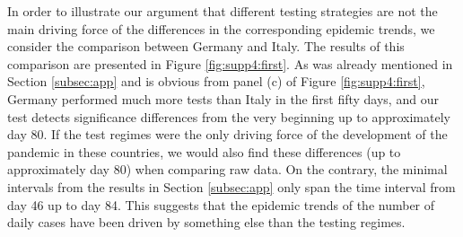 \documentclass[a4paper,12pt]{article}
\numberwithin{equation}{section}
\begin{document}
In order to illustrate our argument that different testing strategies are not the main driving force of the differences in the corresponding epidemic trends, we consider the comparison between Germany and Italy. The results of this comparison are presented in Figure \ref{fig:supp4:first}. As was already mentioned in Section \ref{subsec:app} and is obvious from panel (c) of Figure \ref{fig:supp4:first}, Germany performed much more tests than Italy in the first fifty days, and our test detects significance differences from the very beginning up to approximately day 80. If the test regimes were the only driving force of the development of the pandemic in these countries, we would also find these differences (up to approximately day $80$) when comparing raw data. On the contrary, the minimal intervals from the results in Section \ref{subsec:app} only span the time interval from day 46 up to day 84. This suggests that the epidemic trends of the number of daily cases have been driven by
something else than the testing regimes.
\end{document}
